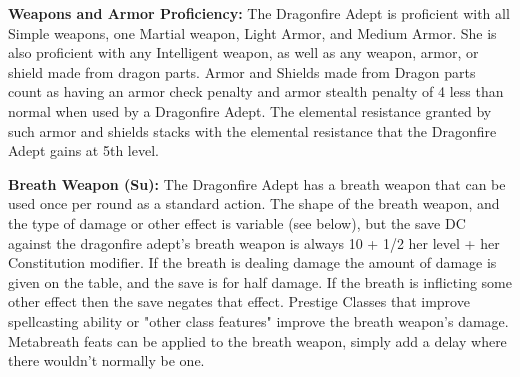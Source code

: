 \modebab{}
\goodfor{}
\goodref{}
\goodwil{}

\begin{extraclasstable}{}
\end{extraclasstable}

\classfeatures

\textbf{Weapons and Armor Proficiency:} The Dragonfire Adept is proficient with all Simple weapons, one Martial weapon, Light Armor, and Medium Armor. She is also proficient with any Intelligent weapon, as well as any weapon, armor, or shield made from dragon parts. Armor and Shields made from Dragon parts count as having an armor check penalty and armor stealth penalty of 4 less than normal when used by a Dragonfire Adept. The elemental resistance granted by such armor and shields stacks with the elemental resistance that the Dragonfire Adept gains at 5th level.

\textbf{Breath Weapon (Su):} The Dragonfire Adept has a breath weapon that can be used once per round as a standard action. The shape of the breath weapon, and the type of damage or other effect is variable (see below), but the save DC against the dragonfire adept's breath weapon is always 10 + 1/2 her level + her Constitution modifier. If the breath is dealing damage the amount of damage is given on the table, and the save is for half damage. If the breath is inflicting some other effect then the save negates that effect. Prestige Classes that improve spellcasting ability or "other class features" improve the breath weapon's damage. Metabreath feats can be applied to the breath weapon, simply add a delay where there wouldn't normally be one.

